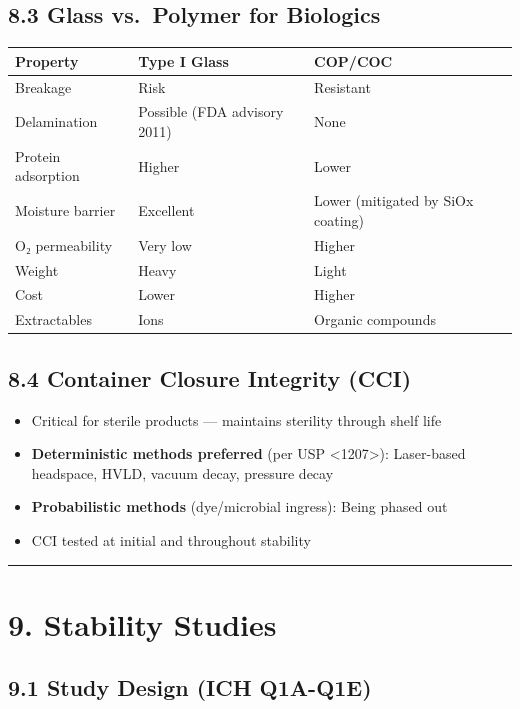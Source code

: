 \documentclass[
  11pt,
  a4paper,
]{report}
\providecommand{\tightlist}{%
  \setlength{\itemsep}{0pt}\setlength{\parskip}{0pt}}
\begin{document}
\hypertarget{glass-vs.-polymer-for-biologics}{%
\subsection{8.3 Glass vs.~Polymer for
Biologics}\label{glass-vs.-polymer-for-biologics}}

\begin{longtable}[]{@{}lll@{}}
\toprule
Property & Type I Glass & COP/COC\tabularnewline
\midrule
\endhead
Breakage & Risk & Resistant\tabularnewline
Delamination & Possible (FDA advisory 2011) & None\tabularnewline
Protein adsorption & Higher & Lower\tabularnewline
Moisture barrier & Excellent & Lower (mitigated by SiOx
coating)\tabularnewline
O₂ permeability & Very low & Higher\tabularnewline
Weight & Heavy & Light\tabularnewline
Cost & Lower & Higher\tabularnewline
Extractables & Ions & Organic compounds\tabularnewline
\bottomrule
\end{longtable}

\hypertarget{container-closure-integrity-cci}{%
\subsection{8.4 Container Closure Integrity
(CCI)}\label{container-closure-integrity-cci}}

\begin{itemize}
\tightlist
\item
  Critical for sterile products --- maintains sterility through shelf
  life
\item
  \textbf{Deterministic methods preferred} (per USP
  \textless1207\textgreater): Laser-based headspace, HVLD, vacuum decay,
  pressure decay
\item
  \textbf{Probabilistic methods} (dye/microbial ingress): Being phased
  out
\item
  CCI tested at initial and throughout stability
\end{itemize}

\begin{center}\rule{0.5\linewidth}{0.5pt}\end{center}

\hypertarget{stability-studies}{%
\section{9. Stability Studies}\label{stability-studies}}

\hypertarget{study-design-ich-q1a-q1e}{%
\subsection{9.1 Study Design (ICH
Q1A-Q1E)}\label{study-design-ich-q1a-q1e}}
\end{document}
